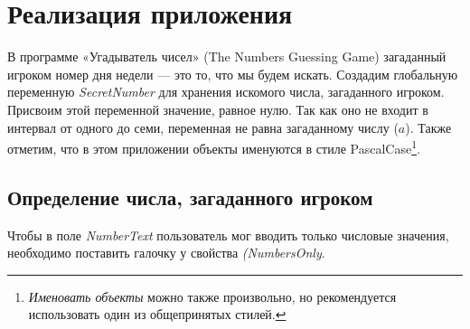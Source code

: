 \section{Реализация приложения}
\label{styles}
В программе «Угадыватель чисел» (The Numbers Guessing Game)\cite{PanfilovaApp} загаданный игроком номер дня недели — это то, что мы будем искать.
Создадим глобальную переменную  \textit{SecretNumber} для хранения искомого числа, загаданного игроком. Присвоим этой переменной значение, равное нулю. 
Так как оно не входит в интервал от одного до семи, переменная не равна загаданному числу ($ a $). Также
отметим, что в этом приложении объекты именуются в стиле PascalCase\footnote[][-0cm]{ \emph{Именовать объекты} 
можно также произвольно, но рекомендуется использовать один из общепринятых стилей.
}. 
\subsection{Определение числа, загаданного игроком}
Чтобы в поле \textit{NumberText} пользователь мог вводить только числовые значения, необходимо поставить галочку у свойства \textit{(NumbersOnly}.


